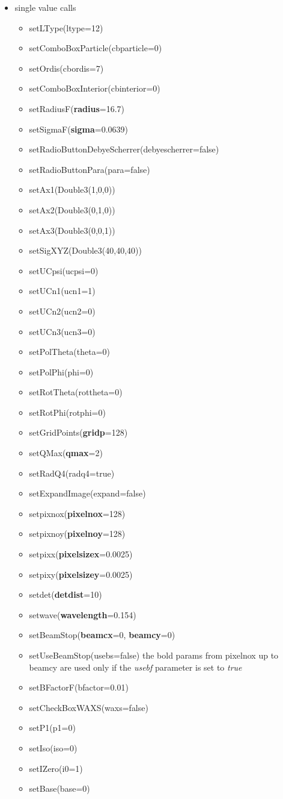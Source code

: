 \documentclass[11pt]{article} %
\begin{document}
\begin{itemize}
\item single value calls
\begin{itemize}\itemsep0pt
\item setLType(ltype=12)
\item setComboBoxParticle(cbparticle=0)
\item setOrdis(cbordis=7)
\item setComboBoxInterior(cbinterior=0)
\item setRadiusF({\bf radius}=16.7)
\item setSigmaF({\bf sigma}=0.0639)
\item setRadioButtonDebyeScherrer(debyescherrer=false)
\item setRadioButtonPara(para=false)
\item setAx1(Double3(1,0,0))
\item setAx2(Double3(0,1,0))
\item setAx3(Double3(0,0,1))
\item setSigXYZ(Double3(40,40,40))
\item setUCpsi(ucpsi=0)
\item setUCn1(ucn1=1)
\item setUCn2(ucn2=0)
\item setUCn3(ucn3=0)
\item setPolTheta(theta=0)
\item setPolPhi(phi=0)
\item setRotTheta(rottheta=0)
\item setRotPhi(rotphi=0)
\item setGridPoints({\bf gridp}=128)
\item setQMax({\bf qmax}=2)
\item setRadQ4(radq4=true)
\item setExpandImage(expand=false)
\item setpixnox({\bf pixelnox}=128)
\item setpixnoy({\bf pixelnoy}=128)
\item setpixx({\bf pixelsizex}=0.0025)
\item setpixy({\bf pixelsizey}=0.0025)
\item setdet({\bf detdist}=10)
\item setwave({\bf wavelength}=0.154)
\item setBeamStop({\bf beamcx}=0, {\bf beamcy}=0)
\item setUseBeamStop(usebs=false) the bold params from pixelnox up to beamcy are used only if the {\it usebf} parameter is set to {\it true}
\item setBFactorF(bfactor=0.01)
\item setCheckBoxWAXS(waxs=false)
\item setP1(p1=0)
\item setIso(iso=0)
\item setIZero(i0=1)
\item setBase(base=0)
\end{itemize}
\end{itemize}
\end{document}
